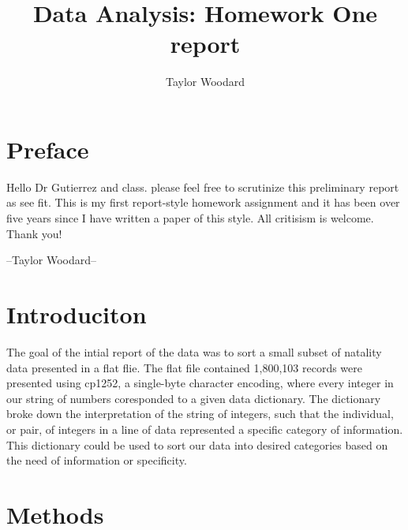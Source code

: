 \documentclass[10pt]{article}
\title{Data Analysis: Homework One report}
\author{Taylor Woodard}
\begin{document}
\maketitle
\section{Preface}
Hello Dr Gutierrez and class. please feel free to scrutinize this preliminary report as see fit. This is my first report-style homework assignment
and it has been over five years since I have written a paper of this style. All critisism is welcome.\\

Thank you!\\
\begin{center}
--Taylor Woodard--
\end{center}
\section{Introduciton}
The goal of the intial report of the data was to sort a small subset of natality data presented in a flat flie. The flat file contained 
1,800,103 records were presented using cp1252, a single-byte character encoding, where every integer in our string of numbers coresponded
to a given data dictionary. The dictionary broke down the interpretation of the string of integers, such that the individual, 
or pair, of integers in a line of data represented a specific category of information. This dictionary could be used to sort our
data into desired categories based on the need of information or specificity.

\section{Methods}
\end{document}
